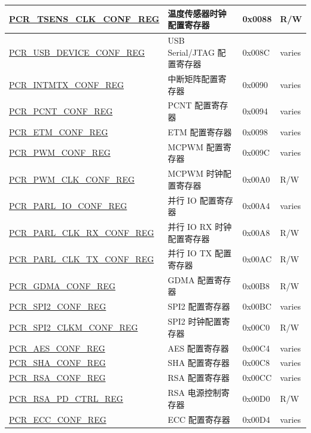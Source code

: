 \begin{longtable}{ | p{7.2cm} | p{6cm} | p{1.3cm} | p{1cm} | }
\hyperref[regdesc:PCRTSENSCLKCONFREG]{PCR\_TSENS\_CLK\_CONF\_REG} & 温度传感器时钟配置寄存器 & 0x0088 & R/W \\ \hline
\hyperref[regdesc:PCRUSBDEVICECONFREG]{PCR\_USB\_DEVICE\_CONF\_REG} & USB Serial/JTAG 配置寄存器 & 0x008C & varies \\ \hline
\hyperref[regdesc:PCRINTMTXCONFREG]{PCR\_INTMTX\_CONF\_REG} & 中断矩阵配置寄存器 & 0x0090 & varies \\ \hline
\hyperref[regdesc:PCRPCNTCONFREG]{PCR\_PCNT\_CONF\_REG} & PCNT 配置寄存器 & 0x0094 & varies \\ \hline
\hyperref[regdesc:PCRETMCONFREG]{PCR\_ETM\_CONF\_REG} & ETM 配置寄存器 & 0x0098 & varies \\ \hline
\hyperref[regdesc:PCRPWMCONFREG]{PCR\_PWM\_CONF\_REG} & MCPWM 配置寄存器 & 0x009C & varies \\ \hline
\hyperref[regdesc:PCRPWMCLKCONFREG]{PCR\_PWM\_CLK\_CONF\_REG} & MCPWM 时钟配置寄存器 & 0x00A0 & R/W \\ \hline
\hyperref[regdesc:PCRPARLIOCONFREG]{PCR\_PARL\_IO\_CONF\_REG} & 并行 IO 配置寄存器 & 0x00A4 & varies \\ \hline
\hyperref[regdesc:PCRPARLCLKRXCONFREG]{PCR\_PARL\_CLK\_RX\_CONF\_REG} & 并行 IO RX 时钟配置寄存器 & 0x00A8 & R/W \\ \hline
\hyperref[regdesc:PCRPARLCLKTXCONFREG]{PCR\_PARL\_CLK\_TX\_CONF\_REG} & 并行 IO TX 配置寄存器 & 0x00AC & R/W \\ \hline
\hyperref[regdesc:PCRGDMACONFREG]{PCR\_GDMA\_CONF\_REG} & GDMA 配置寄存器 & 0x00B8 & R/W \\ \hline
\hyperref[regdesc:PCRSPI2CONFREG]{PCR\_SPI2\_CONF\_REG} & SPI2 配置寄存器 & 0x00BC & varies \\ \hline
\hyperref[regdesc:PCRSPI2CLKMCONFREG]{PCR\_SPI2\_CLKM\_CONF\_REG} & SPI2 时钟配置寄存器 & 0x00C0 & R/W \\ \hline
\hyperref[regdesc:PCRAESCONFREG]{PCR\_AES\_CONF\_REG} & AES 配置寄存器 & 0x00C4 & varies \\ \hline
\hyperref[regdesc:PCRSHACONFREG]{PCR\_SHA\_CONF\_REG} & SHA 配置寄存器 & 0x00C8 & varies \\ \hline
\hyperref[regdesc:PCRRSACONFREG]{PCR\_RSA\_CONF\_REG} & RSA 配置寄存器 & 0x00CC & varies \\ \hline
\hyperref[regdesc:PCRRSAPDCTRLREG]{PCR\_RSA\_PD\_CTRL\_REG} & RSA 电源控制寄存器 & 0x00D0 & R/W \\ \hline
\hyperref[regdesc:PCRECCCONFREG]{PCR\_ECC\_CONF\_REG} & ECC 配置寄存器 & 0x00D4 & varies \\ \hline

\end{longtable}
